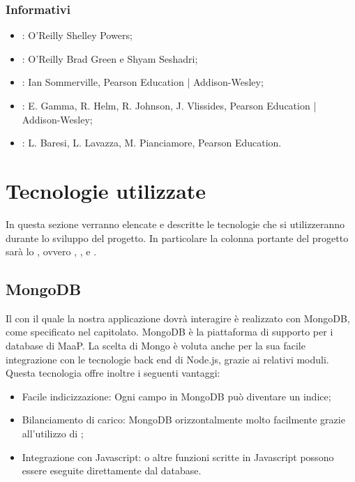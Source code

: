 \subsubsection{Informativi}
\begin{itemize}
\item {}: O'Reilly Shelley Powers;
\item {}: O'Reilly Brad Green e Shyam Seshadri;
\item {}: Ian Sommerville, Pearson Education | Addison-Wesley;
\item {}: E. Gamma, R. Helm, R. Johnson, J. Vlissides, Pearson Education | Addison-Wesley;
\item {}: L. Baresi, L. Lavazza, M. Pianciamore, Pearson Education.
\end{itemize}

\newpage
\section{Tecnologie utilizzate}
In questa sezione verranno elencate e descritte le tecnologie che si utilizzeranno durante lo sviluppo del progetto. 
In particolare la colonna portante del progetto sarà lo  , ovvero , , 
 e .

\subsection{MongoDB}
Il  con il quale la nostra applicazione dovrà interagire è realizzato con MongoDB, come specificato nel capitolato. 
MongoDB è la piattaforma di supporto per i database di MaaP. La scelta di Mongo è voluta anche per la sua facile integrazione con le
tecnologie back end di Node.js, grazie ai relativi moduli. Questa tecnologia offre inoltre i seguenti vantaggi:
\begin{itemize}
\item Facile indicizzazione: Ogni campo in MongoDB può diventare un indice;
\item Bilanciamento di carico: MongoDB  orizzontalmente molto facilmente grazie all'utilizzo di ;
\item Integrazione con Javascript:  o altre funzioni scritte in Javascript possono essere eseguite direttamente dal database.
\end{itemize}

